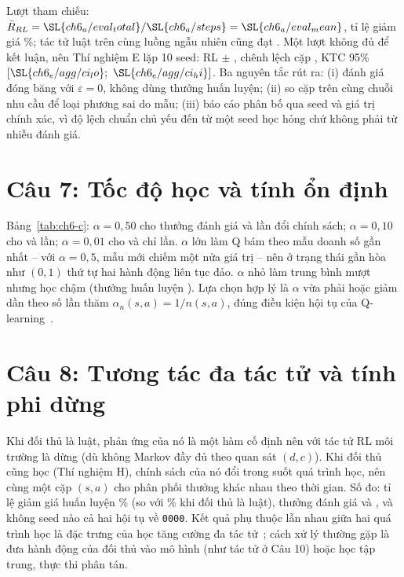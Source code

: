 Lượt tham chiếu: $\bar R_{RL}=\SL{ch6_a/eval_total}/\SL{ch6_a/steps}=\SL{ch6_a/eval_mean}$, tỉ lệ giảm giá \%; tác tử luật trên cùng luồng ngẫu nhiên cũng đạt . Một lượt không đủ để kết luận, nên Thí nghiệm E lặp 10 seed: RL  $\pm$ , chênh lệch cặp , KTC 95\% $[\SL{ch6_e/agg/ci_lo};\ \SL{ch6_e/agg/ci_hi}]$. Ba nguyên tắc rút ra: (i) đánh giá đóng băng với $\varepsilon=0$, không dùng thưởng huấn luyện; (ii) so cặp trên cùng chuỗi nhu cầu để loại phương sai do mẫu; (iii) báo cáo phân bố qua seed và giá trị chính xác, vì độ lệch chuẩn  chủ yếu đến từ một seed học hỏng chứ không phải từ nhiễu đánh giá.

\section{Câu 7: Tốc độ học và tính ổn định}

Bảng~\ref{tab:ch6-c}: $\alpha=0{,}50$ cho thưởng đánh giá  và  lần đổi chính sách; $\alpha=0{,}10$ cho  và  lần; $\alpha=0{,}01$ cho  và chỉ  lần. $\alpha$ lớn làm Q bám theo mẫu doanh số gần nhất -- với $\alpha=0{,}5$, mẫu mới chiếm một nửa giá trị -- nên ở trạng thái gần hòa như $(0,1)$ thứ tự hai hành động liên tục đảo. $\alpha$ nhỏ làm trung bình mượt nhưng học chậm (thưởng huấn luyện ). Lựa chọn hợp lý là $\alpha$ vừa phải hoặc giảm dần theo số lần thăm $\alpha_n(s,a)=1/n(s,a)$, đúng điều kiện hội tụ của Q-learning~\cite{ch2:watkins}.

\section{Câu 8: Tương tác đa tác tử và tính phi dừng}

Khi đối thủ là luật, phản ứng của nó là một hàm cố định nên với tác tử RL môi trường là dừng (dù không Markov đầy đủ theo quan sát $(d,c)$). Khi đối thủ cũng học (Thí nghiệm H), chính sách của nó đổi trong suốt quá trình học, nên cùng một cặp $(s,a)$ cho phân phối thưởng khác nhau theo thời gian. Số đo: tỉ lệ giảm giá huấn luyện \% (so với \% khi đối thủ là luật), thưởng đánh giá  và , và không seed nào cả hai hội tụ về \texttt{0000}. Kết quả phụ thuộc lẫn nhau giữa hai quá trình học là đặc trưng của học tăng cường đa tác tử~\cite{busoniu2008}; cách xử lý thường gặp là đưa hành động của đối thủ vào mô hình (như tác tử ở Câu 10) hoặc học tập trung, thực thi phân tán.

